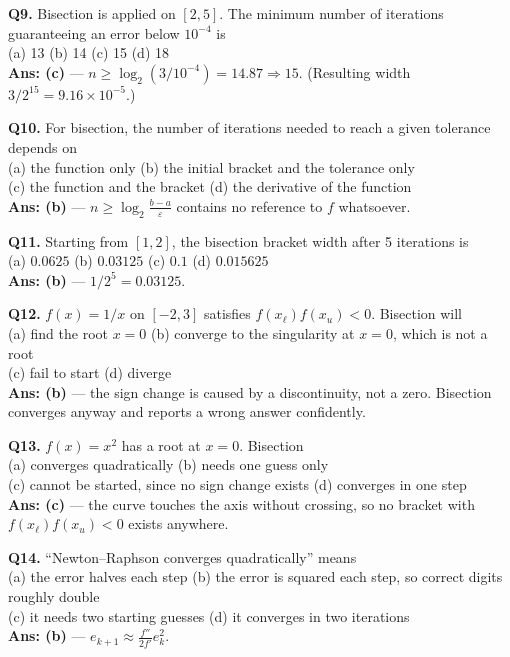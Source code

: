 \begin{mcqbox}
\textbf{Q9.} Bisection is applied on $[2,5]$. The minimum number of iterations guaranteeing an error below $10^{-4}$ is\\
(a) 13 \quad (b) 14 \quad (c) 15 \quad (d) 18\\
\textbf{Ans: (c)} --- $n \ge \log_2(3/10^{-4}) = 14.87 \Rightarrow 15$. (Resulting width $3/2^{15} = 9.16\times10^{-5}$.)

\textbf{Q10.} For bisection, the number of iterations needed to reach a given tolerance depends on\\
(a) the function only \quad (b) the initial bracket and the tolerance only\\
(c) the function and the bracket \quad (d) the derivative of the function\\
\textbf{Ans: (b)} --- $n \ge \log_2\frac{b-a}{\varepsilon}$ contains no reference to $f$ whatsoever.

\textbf{Q11.} Starting from $[1,2]$, the bisection bracket width after 5 iterations is\\
(a) $0.0625$ \quad (b) $0.03125$ \quad (c) $0.1$ \quad (d) $0.015625$\\
\textbf{Ans: (b)} --- $1/2^5 = 0.03125$.

\textbf{Q12.} $f(x) = 1/x$ on $[-2,3]$ satisfies $f(x_\ell)f(x_u)<0$. Bisection will\\
(a) find the root $x=0$ \quad (b) converge to the singularity at $x=0$, which is not a root\\
(c) fail to start \quad (d) diverge\\
\textbf{Ans: (b)} --- the sign change is caused by a discontinuity, not a zero. Bisection converges anyway and reports a wrong answer confidently.

\textbf{Q13.} $f(x)=x^2$ has a root at $x=0$. Bisection\\
(a) converges quadratically \quad (b) needs one guess only\\
(c) cannot be started, since no sign change exists \quad (d) converges in one step\\
\textbf{Ans: (c)} --- the curve touches the axis without crossing, so no bracket with $f(x_\ell)f(x_u)<0$ exists anywhere.

\textbf{Q14.} ``Newton--Raphson converges quadratically'' means\\
(a) the error halves each step \quad (b) the error is squared each step, so correct digits roughly double\\
(c) it needs two starting guesses \quad (d) it converges in two iterations\\
\textbf{Ans: (b)} --- $e_{k+1}\approx\frac{f''}{2f'}e_k^2$.


\end{mcqbox}
